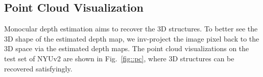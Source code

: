 \documentclass[runningheads]{llncs}
\begin{document}
\subsection{Point Cloud Visualization}
Monocular depth estimation aims to recover the 3D structures. To better see the 3D shape of the estimated depth map, we inv-project the image pixel back to the 3D space via the estimated depth maps. The point cloud visualizations on the test set of NYUv2 are shown in Fig.~\ref{fig::pc}, where 3D structures can be recovered satisfyingly.

\clearpage
\end{document}

